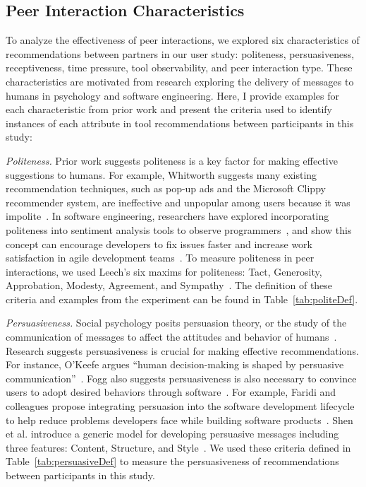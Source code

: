 \subsection{Peer Interaction Characteristics}

To analyze the effectiveness of peer interactions, we explored six characteristics of recommendations between partners in our user study: politeness, persuasiveness, receptiveness, time pressure, tool observability, and peer interaction type. These characteristics are motivated from research exploring the delivery of messages to humans in psychology and software engineering. Here, I provide examples for each characteristic from prior work and present the criteria used to identify instances of each attribute in tool recommendations between participants in this study:


\textit{Politeness.} Prior work suggests politeness is a key factor for making effective suggestions to humans. For example, Whitworth suggests many existing recommendation techniques, such as pop-up ads and the Microsoft Clippy recommender system, are ineffective and unpopular among users because it was impolite~\cite{WhitworthPolite}. In software engineering, researchers have explored incorporating politeness into sentiment analysis tools to observe programmers~\cite{danescuniculescumizil2013computational}, and show this concept can encourage developers to fix issues faster and increase work satisfaction in agile development teams~\cite{Ortu15WouldYouMind}.
To measure politeness in peer interactions, we used Leech's six maxims for politeness: Tact, Generosity, Approbation, Modesty, Agreement, and Sympathy~\cite{LeechPragmatics}. The definition of these criteria and examples from the experiment can be found in Table~\ref{tab:politeDef}.

\textit{Persuasiveness.} Social psychology posits persuasion theory, or the study of the communication of messages to affect the attitudes and behavior of humans~\cite{Gardikiotis15Persuasion}. Research suggests persuasiveness is crucial for making effective recommendations. For instance, O'Keefe argues ``human decision-making is shaped by persuasive communication''~\citep[p.~31]{okeefe2002persuasion}. Fogg also suggests persuasiveness is also necessary to convince users to adopt desired behaviors through software~\cite{Fogg2009Persuasive}. For example, Faridi and colleagues propose integrating persuasion into the software development lifecycle to help reduce problems developers face while building software products~\cite{faridi2012human}. Shen et al. introduce a generic model for developing persuasive messages including three features: Content, Structure, and Style~\cite{ShenMessageFeatures}. We used these criteria defined in Table~\ref{tab:persuasiveDef} to measure the persuasiveness of recommendations between participants in this study.

